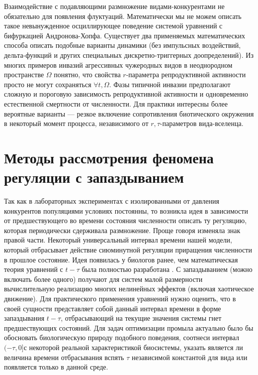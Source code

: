 \documentclass[a4paper,11pt,twoside]{article}
\begin{document}
Взаимодействие с подавляющими размножение видами-конкурентами не обязательно для появления флуктуаций. Математически мы не можем описать такое невынужденное осциллирующее поведение системой уравнений с бифуркацией Андронова-Хопфа. Существует два применяемых математических способа описать подобные варианты динамики (без импульсных воздействий, дельта-функций и других специальных дискретно-триггерных доопределений). Из многих примеров инвазий агрессивных чужеродных видов в неоднородном пространстве $\Omega$ понятно, что свойства $r$-параметра репродуктивной активности  просто не могут сохраняться
$\forall t,\Omega$. Фазы типичной инвазии предполагают сложную и пороговую зависимость репродуктивной активности и одновременно естественной смертности от численности. Для практики интересны более вероятные варианты --- резкое включение сопротивления биотического окружения в некоторый момент процесса, независимого от $r,\tau$-параметров вида-вселенца.

\section{Методы рассмотрения феномена регуляции с запаздыванием}

Так как в лабораторных экспериментах с изолированными от давления конкурентов популяциями условиях постоянны, то возникла идея в зависимости от предшествующего во времени состояния численности описать ту регуляцию, которая периодически сдерживала размножение. Проще говоря изменяла знак правой части. Некоторый универсальный интервал времени нашей модели, который отбрасывает действие сиюминутной регуляции приращения численности в прошлое состояние. Идея появилась у биологов ранее, чем математическая теория уравнений с $t-\tau$ была полностью разработана \cite{Bacaer}. С запаздыванием (можно включать  более одного) получают для систем малой размерности вычислительную реализацию многих нелинейных эффектов (включая хаотическое движение).  Для практического применения уравнений нужно оценить, что в своей сущности представляет собой данный интервал времени в форме запаздывания $t-\tau$, отбрасывающий на текущие значения системы гнет предшествующих состояний. Для задач оптимизации промыла актуально было бы обосновать биологическую природу подобного поведения, соотнеси интервал $(-\tau, 0]$с некоторой реальной характеристикой биосистемы, указать является ли величина времени отбрасывания вспять $\tau$ независимой константой для вида или появляется только в данной среде.
\end{document}
